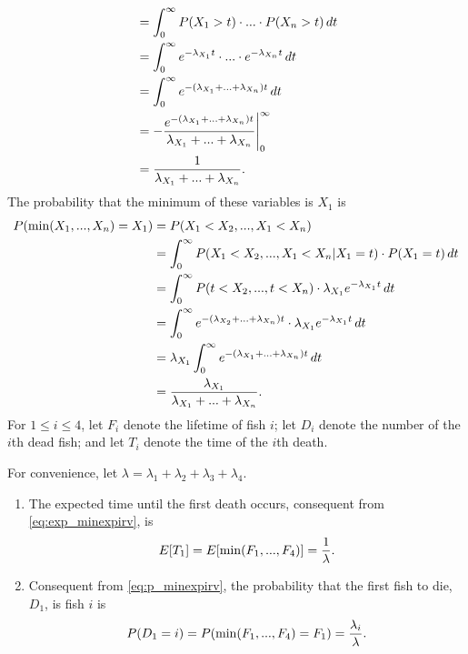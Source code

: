 \documentclass{article}
\begin{document}
\begin{enumerate}
\begin{equation}
\begin{split}
                                    & = \int_0^\infty P( X_1 > t )\cdot ... \cdot P( X_n > t )\, dt \\
                                    & = \int_0^\infty e^{-\lambda_{X_1}t}\cdot ...\cdot e^{-\lambda_{X_n}t} \, dt \\
                                    & = \int_0^\infty e^{-(\lambda_{X_1}+...+\lambda_{X_n})t} \, dt \\
                                    & = - \frac{e^{-(\lambda_{X_1}+...+\lambda_{X_n})t}}{\lambda_{X_1}+...+\lambda_{X_n}}\Bigg|_0^\infty \\
                                    & = \frac{1}{\lambda_{X_1}+...+\lambda_{X_n}}\text. \\
    \end{split}\end{equation}
    The probability that the minimum of these variables is $X_1$ is
    \begin{equation}\label{eq:p_minexpirv}\begin{split}
    P(\min( X_1, ..., X_n ) = X_1 )   & = P( X_1<X_2, ..., X_1<X_n ) \\
                                            & = \int_0^\infty P(X_1<X_2, ..., X_1<X_n|X_1=t)\cdot P(X_1=t)\, dt \\
                                            & = \int_0^\infty P(t<X_2, ..., t<X_n)\cdot \lambda_{X_1}e^{-\lambda_{X_1}t}\, dt \\
                                            & = \int_0^\infty e^{-(\lambda_{X_2}+...+\lambda_{X_n})t}\cdot \lambda_{X_1}e^{-\lambda_{X_1}t}\, dt \\
                                            & = \lambda_{X_1}\int_0^\infty e^{-(\lambda_{X_1}+...+\lambda_{X_n})t}\, dt \\
                                            & = \frac{\lambda_{X_1}}{\lambda_{X_1}+...+\lambda_{X_n}}\text. \\
    \end{split}\end{equation}
    For $1 \leq i \leq 4$, let $F_i$ denote the lifetime of fish $i$; let $D_i$ denote the number of the $i$th dead fish; and let $T_i$ denote the
    time of the $i$th death.

    For convenience, let $\lambda = \lambda_1 + \lambda_2 + \lambda_3 + \lambda_4$.
    \begin{enumerate}
    \item
        The expected time until the first death occurs, consequent from \eqref{eq:exp_minexpirv}, is
        $$E[T_1]=E[\min(F_1, ..., F_4)] = \frac{1}{\lambda}\text.$$
    \item
        Consequent from \eqref{eq:p_minexpirv}, the probability that the first fish to die, $D_1$, is fish $i$ is
        $$P(D_1=i) = P(\min(F_1, ..., F_4) = F_1) = \frac{\lambda_i}{\lambda}\text.$$


\end{enumerate}
\end{enumerate}
\end{document}
